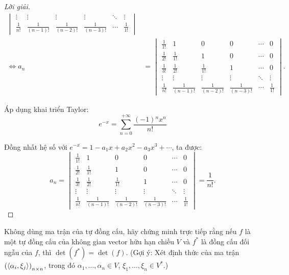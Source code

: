 \documentclass[class=linearalgebra,crop=false]{standalone}
\begin{document}
\begin{proof}[Lời giải]
\begin{align*}
\begin{vmatrix}
            \vdots       & \vdots           & \vdots           & \vdots           & \ddots & \vdots       \\
            \frac{1}{n!} & \frac{1}{(n-1)!} & \frac{1}{(n-2)!} & \frac{1}{(n-3)!} & \cdots & \frac{1}{1!}
        \end{vmatrix}  \\
        \Longleftrightarrow a_{n} & =
        \begin{vmatrix}
            \frac{1}{1!} & 1                & 0                & 0                & \cdots & 0            \\
            \frac{1}{2!} & \frac{1}{1!}     & 1                & 0                & \cdots & 0            \\
            \frac{1}{3!} & \frac{1}{2!}     & \frac{1}{1!}     & 1                & \cdots & 0            \\
            \vdots       & \vdots           & \vdots           & \vdots           & \ddots & \vdots       \\
            \frac{1}{n!} & \frac{1}{(n-1)!} & \frac{1}{(n-2)!} & \frac{1}{(n-3)!} & \cdots & \frac{1}{1!}
        \end{vmatrix}.
    \end{align*}

    \par Áp dụng khai triển Taylor:
    \[
        e^{-x} = \sum^{+\infty}_{n=0}\frac{(-1){}^{n}x^{n}}{n!}
    \]
    \par Đồng nhất hệ số với $e^{-x} = 1 - a_{1}x + a_{2}x^{2} - a_{3}x^{3} + \cdots$, ta được:
    \[
        a_{n} =
        \begin{vmatrix}
            \frac{1}{1!} & 1                & 0                & 0                & \cdots & 0            \\
            \frac{1}{2!} & \frac{1}{1!}     & 1                & 0                & \cdots & 0            \\
            \frac{1}{3!} & \frac{1}{2!}     & \frac{1}{1!}     & 1                & \cdots & 0            \\
            \vdots       & \vdots           & \vdots           & \vdots           & \ddots & \vdots       \\
            \frac{1}{n!} & \frac{1}{(n-1)!} & \frac{1}{(n-2)!} & \frac{1}{(n-3)!} & \cdots & \frac{1}{1!}
        \end{vmatrix}
        = \frac{1}{n!}.
    \]
\end{proof}

\begin{exercise}
    \par Không dùng ma trận của tự đồng cấu, hãy chứng minh trực tiếp rằng nếu $f$ là một tự đồng cấu của không gian vector hữu hạn chiều $V$ và $f^{*}$ là đồng cấu đối ngẫu của $f$, thì $\det(f^{*}) = \det(f)$. (Gợi ý: Xét định thức của ma trận $\left(\left\langle{\alpha_{i},\xi_{j}}\right\rangle\right)_{n\times n}$, trong đó $\alpha_{1},\ldots,\alpha_{n}\in V$, $\xi_{1},\ldots,\xi_{n}\in V^{*}$.)
\end{exercise}
\end{document}
